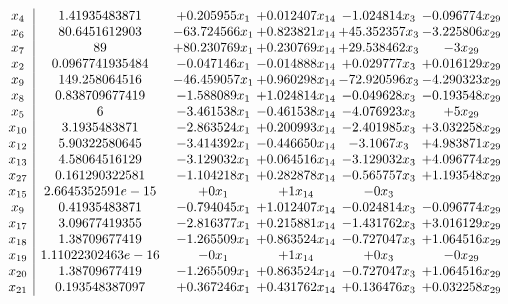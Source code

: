 \documentclass[11pt]{article}
\begin{document}
\[\begin{array}{c| c c@{\hskip 2pt} c@{\hskip 2pt} c@{\hskip 2pt} c@{\hskip 2pt} }
 x_{4}   &  1.41935483871 & + 0.205955 x_{1} & + 0.012407 x_{14} & -1.024814 x_{3} & -0.096774 x_{29}\\
 x_{6}   &  80.6451612903 & -63.724566 x_{1} & + 0.823821 x_{14} & + 45.352357 x_{3} & -3.225806 x_{29}\\
 x_{7}   &  89 & + 80.230769 x_{1} & + 0.230769 x_{14} & + 29.538462 x_{3} & -3 x_{29}\\
 x_{2}   &  0.0967741935484 & -0.047146 x_{1} & -0.014888 x_{14} & + 0.029777 x_{3} & + 0.016129 x_{29}\\
 x_{9}   &  149.258064516 & -46.459057 x_{1} & + 0.960298 x_{14} & -72.920596 x_{3} & -4.290323 x_{29}\\
 x_{8}   &  0.838709677419 & -1.588089 x_{1} & + 1.024814 x_{14} & -0.049628 x_{3} & -0.193548 x_{29}\\
 x_{5}   &  6 & -3.461538 x_{1} & -0.461538 x_{14} & -4.076923 x_{3} & + 5 x_{29}\\
 x_{10}   &  3.1935483871 & -2.863524 x_{1} & + 0.200993 x_{14} & -2.401985 x_{3} & + 3.032258 x_{29}\\
 x_{12}   &  5.90322580645 & -3.414392 x_{1} & -0.446650 x_{14} & -3.1067 x_{3} & + 4.983871 x_{29}\\
 x_{13}   &  4.58064516129 & -3.129032 x_{1} & + 0.064516 x_{14} & -3.129032 x_{3} & + 4.096774 x_{29}\\
 x_{27}   &  0.161290322581 & -1.104218 x_{1} & + 0.282878 x_{14} & -0.565757 x_{3} & + 1.193548 x_{29}\\
 x_{15}   &  2.6645352591e-15 & + 0 x_{1} & + 1 x_{14} & -0 x_{3} &   \\
 x_{9}   &  0.41935483871 & -0.794045 x_{1} & + 1.012407 x_{14} & -0.024814 x_{3} & -0.096774 x_{29}\\
 x_{17}   &  3.09677419355 & -2.816377 x_{1} & + 0.215881 x_{14} & -1.431762 x_{3} & + 3.016129 x_{29}\\
 x_{18}   &  1.38709677419 & -1.265509 x_{1} & + 0.863524 x_{14} & -0.727047 x_{3} & + 1.064516 x_{29}\\
 x_{19}   &  1.11022302463e-16 & -0 x_{1} & + 1 x_{14} & + 0 x_{3} & -0 x_{29}\\
 x_{20}   &  1.38709677419 & -1.265509 x_{1} & + 0.863524 x_{14} & -0.727047 x_{3} & + 1.064516 x_{29}\\
 x_{21}   &  0.193548387097 & + 0.367246 x_{1} & + 0.431762 x_{14} & + 0.136476 x_{3} & + 0.032258 x_{29}\\

\end{array}\]
\end{document}
